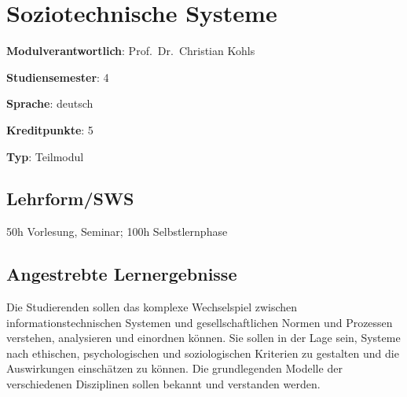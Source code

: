 \hypertarget{soziotechnische-systemepathlabelmi-2017modulbeschreibungen-bachelorba_sc_soziotechnische-systeme}{%
\chapter{Soziotechnische
Systeme\label{/mi-2017/modulbeschreibungen-bachelor/BA_SC_soziotechnische-systeme}}\label{soziotechnische-systemepathlabelmi-2017modulbeschreibungen-bachelorba_sc_soziotechnische-systeme}}

\begin{modulHead}
\textbf{Modulverantwortlich}: Prof.~Dr.~Christian
Kohls
\end{modulHead}
\begin{modulHead}
\textbf{Studiensemester}:
4
\end{modulHead}
\begin{modulHead}
\textbf{Sprache}:
deutsch
\end{modulHead}
\begin{modulHead}
\textbf{Kreditpunkte}:
5
\end{modulHead}
\begin{modulHead}
\textbf{Typ}:
Teilmodul
\end{modulHead}


\hypertarget{lehrformswspathlabelmi-2017modulbeschreibungen-bachelorba_sc_soziotechnische-systeme}{%
\section*{Lehrform/SWS\label{/mi-2017/modulbeschreibungen-bachelor/BA_SC_soziotechnische-systeme}}\label{lehrformswspathlabelmi-2017modulbeschreibungen-bachelorba_sc_soziotechnische-systeme}}

50h Vorlesung, Seminar; 100h Selbstlernphase

\hypertarget{angestrebte-lernergebnissepathlabelmi-2017modulbeschreibungen-bachelorba_sc_soziotechnische-systeme}{%
\section*{Angestrebte
Lernergebnisse\label{/mi-2017/modulbeschreibungen-bachelor/BA_SC_soziotechnische-systeme}}\label{angestrebte-lernergebnissepathlabelmi-2017modulbeschreibungen-bachelorba_sc_soziotechnische-systeme}}

Die Studierenden sollen das komplexe Wechselspiel zwischen
informationstechnischen Systemen und gesellschaftlichen Normen und
Prozessen verstehen, analysieren und einordnen können. Sie sollen in der
Lage sein, Systeme nach ethischen, psychologischen und soziologischen
Kriterien zu gestalten und die Auswirkungen einschätzen zu können. Die
grundlegenden Modelle der verschiedenen Disziplinen sollen bekannt und
verstanden werden.

